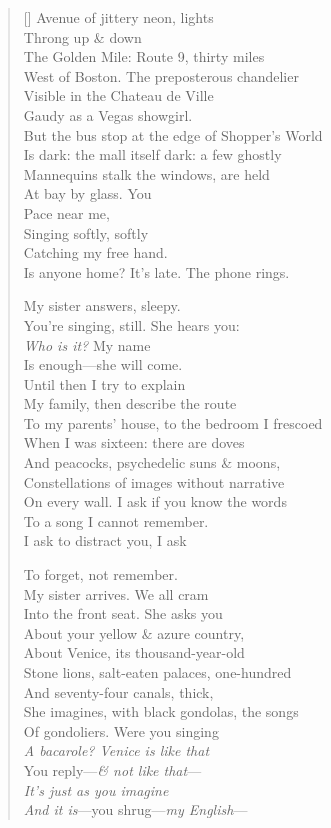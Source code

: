 \label{ch:the_golden_mile}
\settowidth{\versewidth}{Off the Golden Mile: behind us, night closes over}
\begin{verse}[\versewidth]
Avenue of jittery neon, lights\\
Throng up \& down\\
The Golden Mile: Route 9, thirty miles\\
West of Boston. The preposterous chandelier\\
Visible in the Chateau de Ville\\
Gaudy as a Vegas showgirl.\\
But the bus stop at the edge of Shopper's World\\
Is dark: the mall itself dark: a few ghostly\\
Mannequins stalk the windows, are held\\
At bay by glass. You\\
Pace near me,\\
Singing softly, softly\\
Catching my free hand.\\
Is anyone home?  It's late.  The phone rings.

My sister answers, sleepy.\\
You're singing, still. She hears you:\\
\textit{Who is it?} My name\\
Is enough---she will come.\\
Until then I try to explain\\
My family, then describe the route\\
To my parents' house, to the bedroom I frescoed\\
When I was sixteen: there are doves\\
And peacocks, psychedelic suns \& moons,\\
Constellations of images without narrative\\
On every wall. I ask if you know the words\\
To a song I cannot remember.\\
I ask to distract you, I ask

To forget, not remember.\\
My sister arrives.  We all cram\\
Into the front seat. She asks you\\
About your yellow \& azure country,\\
About Venice, its thousand-year-old\\
Stone lions, salt-eaten palaces, one-hundred\\
And seventy-four canals, thick,\\
She imagines, with black gondolas, the songs\\
Of gondoliers. Were you singing\\
\textit{A bacarole? Venice is like that}\\
You reply---\textit{\& not like that}---\\
\textit{It's just as you imagine}\\
\textit{And it is}---you shrug---\textit{my English}---


\end{verse}
